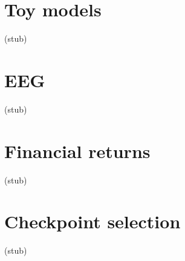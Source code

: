 \documentclass[10pt]{article}
\begin{document}


\appendix
\section{Toy models}\label{app:toys}         (stub)
\section{EEG}\label{app:eeg}                 (stub)
\section{Financial returns}\label{app:finance} (stub)
\section{Checkpoint selection}\label{app:selection} (stub)
\end{document}
